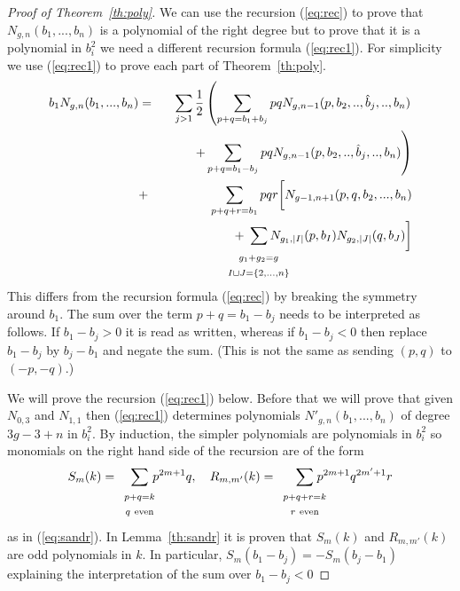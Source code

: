 \documentclass{amsart}
\begin{document}
\begin{proof}[Proof of Theorem~\ref{th:poly}]
We can use the recursion (\ref{eq:rec}) to prove that $N_{g,n}(b_1,...,b_n)$ is a polynomial of the right degree but to prove that it is a polynomial in $b_i^2$ we need a different recursion formula (\ref{eq:rec1}).  For simplicity we use (\ref{eq:rec1}) to prove each part of Theorem~\ref{th:poly}.
{\setlength\arraycolsep{2pt} 
\begin{eqnarray}   \label{eq:rec1}
b_1N_{g,n}(b_1,...,b_n)&=&\sum_{j>1}\frac{1}{2}\left(\sum_{p+q=b_1+b_j}pqN_{g,n-1}(p,b_2,..,\hat{b}_j,..,b_n)\right.\\
&&\left.\quad\quad+\sum_{p+q=b_1-b_j}pqN_{g,n-1}(p,b_2,..,\hat{b}_j,..,b_n)\right)\nonumber\\
&+&\sum_{p+q+r=b_1} pqr\biggl[N_{g-1,n+1}(p,q,b_2,...,b_n)\nonumber\\
&&\hspace{20mm}+\hspace{-7mm}\sum_{\begin{array}{c}_{g_1+g_2=g}\\_{I\sqcup J=\{2,...,n\}}\end{array}}\hspace{-8mm}N_{g_1,|I|}(p,b_I)N_{g_2,|J|}(q,b_J)\biggr]\nonumber
\end{eqnarray}}
This differs from the recursion formula (\ref{eq:rec}) by breaking the symmetry around $b_1$.  The sum over the term $p+q=b_1-b_j$ needs to be interpreted as follows.  If $b_1-b_j>0$ it is read as written, whereas if $b_1-b_j<0$ then replace $b_1-b_j$ by $b_j-b_1$ and negate the sum.  (This is not the same as sending $(p,q)$ to $(-p,-q)$.)

We will prove the recursion (\ref{eq:rec1}) below.  Before that we will prove that given $N_{0,3}$ and $N_{1,1}$ then (\ref{eq:rec1}) determines polynomials $N'_{g,n}(b_1,...,b_n)$ of degree $3g-3+n$ in $b_i^2$.  By induction, the simpler polynomials are polynomials in $b_i^2$ so monomials on the right hand side of the recursion are of the form 
\[ S_m(k)=\sum_{\begin{array}{c}\scriptstyle p+q=k\\\scriptstyle q{\rm\ even}\end{array}}\hspace{-3mm}p^{2m+1}q,\quad R_{m,m'}(k)=\sum_{\begin{array}{c}\scriptstyle p+q+r=k\\\scriptstyle r{\rm\ even}\end{array}}\hspace{-5mm}p^{2m+1}q^{2m'+1}r\]
as in (\ref{eq:sandr}).  In Lemma~\ref{th:sandr} it is proven that $S_m(k)$ and $R_{m,m'}(k)$ are odd polynomials in $k$.  In particular, $S_m(b_1-b_j)=-S_m(b_j-b_1)$ explaining the interpretation of the sum over $b_1-b_j<0$


\end{proof}
\end{document}
